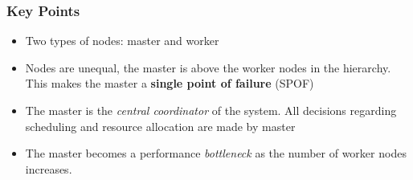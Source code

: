\documentclass{article}
\begin{document}
\subsubsection{Key Points}
\begin{itemize}
    \item Two types of nodes: master and worker
    
    \item Nodes are unequal, the master is above the worker nodes in the hierarchy. This makes the master a \textbf{single point of failure} (SPOF)
    
    \item The master is the \textit{central coordinator} of the system. All decisions regarding scheduling and resource allocation are made by master
    
    \item The master becomes a performance \textit{bottleneck} as the number of worker nodes increases. 
\end{itemize}
\end{document}
